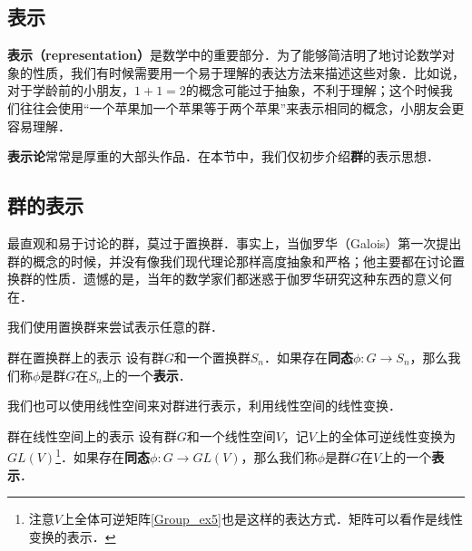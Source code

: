 
\subsection{表示}

\textbf{表示（representation）}是数学中的重要部分．为了能够简洁明了地讨论数学对象的性质，我们有时候需要用一个易于理解的表达方法来描述这些对象．比如说，对于学龄前的小朋友，$1+1=2$的概念可能过于抽象，不利于理解；这个时候我们往往会使用“一个苹果加一个苹果等于两个苹果”来表示相同的概念，小朋友会更容易理解．

\textbf{表示论}常常是厚重的大部头作品．在本节中，我们仅初步介绍\textbf{群}的表示思想．

\subsection{群的表示}

最直观和易于讨论的群，莫过于置换群．事实上，当伽罗华（Galois）第一次提出群的概念的时候，并没有像我们现代理论那样高度抽象和严格；他主要都在讨论置换群的性质．遗憾的是，当年的数学家们都迷惑于伽罗华研究这种东西的意义何在．

我们使用置换群来尝试表示任意的群．

\begin{definition}{群在置换群上的表示}
设有群$G$和一个置换群$S_n$．如果存在\textbf{同态}$\phi: G\rightarrow S_n$，那么我们称$\phi$是群$G$在$S_n$上的一个\textbf{表示}．
\end{definition}

我们也可以使用线性空间来对群进行表示，利用线性空间的线性变换．

\begin{definition}{群在线性空间上的表示}
设有群$G$和一个线性空间$V$，记$V$上的全体可逆线性变换为$GL(V)$\footnote{注意$V$上全体可逆矩阵\autoref{Group_ex5}也是这样的表达方式．矩阵可以看作是线性变换的表示．}．如果存在\textbf{同态}$\phi: G\rightarrow GL(V)$，那么我们称$\phi$是群$G$在$V$上的一个\textbf{表示}．
\end{definition}